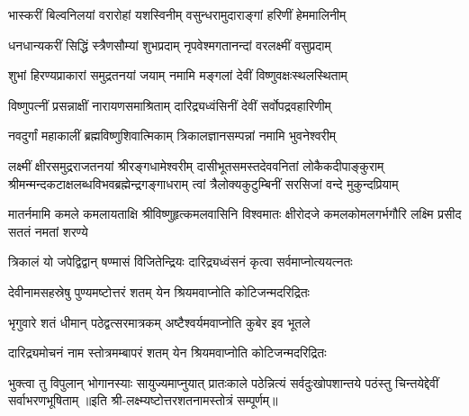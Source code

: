 \twolineshloka
{भास्करीं बिल्वनिलयां वरारोहां यशस्विनीम्}
{वसुन्धरामुदाराङ्गां हरिणीं हेममालिनीम्}

\twolineshloka
{धनधान्यकरीं सिद्धिं स्त्रैणसौम्यां शुभप्रदाम्}
{नृपवेश्मगतानन्दां वरलक्ष्मीं वसुप्रदाम्}

\twolineshloka
{शुभां हिरण्यप्राकारां समुद्रतनयां जयाम्}
{नमामि मङ्गलां देवीं विष्णुवक्षःस्थलस्थिताम्}

\twolineshloka
{विष्णुपत्नीं प्रसन्नाक्षीं नारायणसमाश्रिताम्}
{दारिद्र्यध्वंसिनीं देवीं सर्वोपद्रवहारिणीम्}

\twolineshloka
{नवदुर्गां महाकालीं ब्रह्मविष्णुशिवात्मिकाम्}
{त्रिकालज्ञानसम्पन्नां नमामि भुवनेश्वरीम्}

\fourlineindentedshloka
{लक्ष्मीं क्षीरसमुद्रराजतनयां श्रीरङ्गधामेश्वरीम्}
{दासीभूतसमस्तदेववनितां लोकैकदीपाङ्कुराम्}
{श्रीमन्मन्दकटाक्षलब्धविभवब्रह्मेन्द्रगङ्गाधराम्}
{त्वां त्रैलोक्यकुटुम्बिनीं सरसिजां वन्दे मुकुन्दप्रियाम्}

\fourlineindentedshloka
{मातर्नमामि कमले कमलायताक्षि}
{श्रीविष्णुहृत्कमलवासिनि विश्वमातः}
{क्षीरोदजे कमलकोमलगर्भगौरि}
{लक्ष्मि प्रसीद सततं नमतां शरण्ये}

\twolineshloka
{त्रिकालं यो जपेद्विद्वान् षण्मासं विजितेन्द्रियः}
{दारिद्र्यध्वंसनं कृत्वा सर्वमाप्नोत्ययत्नतः}

\twolineshloka
{देवीनामसहस्रेषु पुण्यमष्टोत्तरं शतम्}
{येन श्रियमवाप्नोति कोटिजन्मदरिद्रितः}

\twolineshloka
{भृगुवारे शतं धीमान् पठेद्वत्सरमात्रकम्}
{अष्टैश्वर्यमवाप्नोति कुबेर इव भूतले}

\twolineshloka
{दारिद्र्यमोचनं नाम स्तोत्रमम्बापरं शतम्}
{येन श्रियमवाप्नोति कोटिजन्मदरिद्रितः}

\threelineshloka
{भुक्त्वा तु विपुलान् भोगानस्याः सायुज्यमाप्नुयात्}
{प्रातःकाले पठेन्नित्यं सर्वदुःखोपशान्तये}
{पठंस्तु चिन्तयेद्देवीं सर्वाभरणभूषिताम्}
॥इति श्री-लक्ष्म्यष्टोत्तरशतनामस्तोत्रं सम्पूर्णम्॥